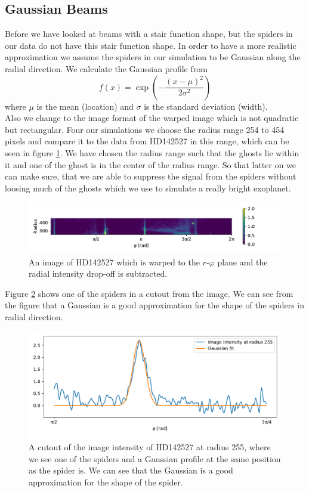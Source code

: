 \subsection{Gaussian Beams}
Before we have looked at beams with a stair function shape, but the spiders in our data do not have this stair function shape. In order to have a more realistic approximation we assume the spiders in our simulation to be Gaussian along the radial direction. We calculate the Gaussian profile from 
\begin{equation}
	f(x) = \exp \left(-\frac{(x-\mu)^2}{2 \sigma^2} \right)
\end{equation}
where $\mu$ is the mean (location) and $\sigma$ is the standard deviation (width). \\
Also we change to the image format of the warped image which is not quadratic but rectangular. Four our simulations we choose the radius range 254 to 454 pixels and compare it to the data from HD142527 in this range, which can be seen in figure \ref{fig:warped_254_454}. We have chosen the radius range such that the ghosts lie within it and one of the ghost is in the center of the radius range. So that latter on we can make sure, that we are able to suppress the signal from the spiders without loosing much of the ghosts which we use to simulate a really bright exoplanet. 
\begin{figure}[H]
	\centering
		\includegraphics[width=1.0\textwidth]{pics/warped_254_454.pdf}
		\caption{An image of HD142527 which is warped to the $r$-$\varphi$ plane and the radial intensity drop-off is subtracted.}
		\label{fig:warped_254_454}
\end{figure}
Figure \ref{fig:spider_gaussian} shows one of the spiders in a cutout from the image. We can see from the figure that a Gaussian is a good approximation for the shape of the spiders in radial direction.
\begin{figure}[H]
	\centering
		\includegraphics[width=1.0\textwidth]{pics/spyder_gaussian.pdf}
		\caption{A cutout of the image intensity of HD142527 at radius 255, where we see one of the spiders and a Gaussian profile at the same position as the spider is. We can see that the Gaussian is a good approximation for the shape of the spider.}
		\label{fig:spider_gaussian}
\end{figure}
